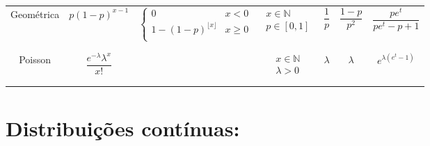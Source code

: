 \documentclass[12pt]{article}
\begin{document}
\begin{tabular}{| c | c | c | c | c | c | c |}
    Geométrica &
    $p (1-p)^{x-1}$ &
    $\begin{cases}
    	0           & x < 0 \\
    	1 - (1-p)^{\lfloor x \rfloor} & x \geq 0 \\
    \end{cases}$ &
    $\begin{matrix}
    	x \in \mathds N \\
    	p \in [0,1] \\
    \end{matrix}$ &
    $\dfrac{1}{p}$ &
    $\dfrac{1-p}{p^2}$ &
    $\dfrac{pe^t}{pe^t - p + 1}$ \\

    \rule{0pt}{0pt} & & & & & & \\ \hline \rule{0pt}{0pt} & & & & & & \\

    Poisson &
    $\dfrac{e^{-\lambda} \lambda^x}{x!}$ &
    &
    $\begin{matrix}
    	x \in \mathds N \\
    	\lambda > 0 \\
    \end{matrix}$ &
    $\lambda$ &
    $\lambda$ &
    $e^{\lambda (e^t -1)}$ \\

 	\rule{0pt}{0pt} & & & & & & \\ \hline

\end{tabular}

\section{Distribuições contínuas:}
\end{document}
